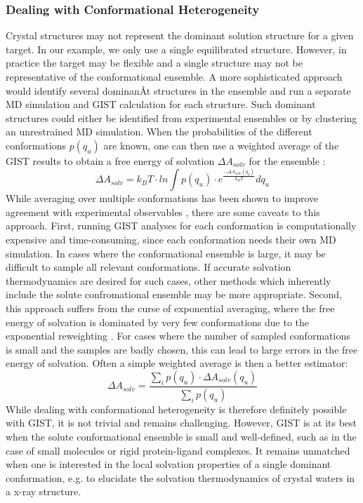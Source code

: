 \documentclass[9pt,tutorial]{livecoms}
\begin{document}
\subsubsection{Dealing with Conformational Heterogeneity}
Crystal structures may not represent the dominant solution structure for a given target.
In our example, we only use a single equilibrated structure.
However, in practice the target may be flexible and a single structure may not be representative of the conformational ensemble.
A more sophisticated approach would identify several dominanÅt structures in the ensemble and run a separate MD simulation and GIST calculation for each structure. 
Such dominant structures could either be identified from experimental ensembles or by clustering an unrestrained MD simulation. 
When the probabilities of the different conformations $p(q_u)$ are known, one can then use a weighted average of the GIST results to obtain a free energy of solvation $\Delta A_{solv}$ for the ensemble \cite{Waibl2021-gist-antibodies}:
\begin{equation}
	\Delta A_{solv} = k_BT \cdot ln \int p(q_u) \cdot e^{ \frac{-\Delta A_{solv}(q_u)}{k_BT}} dq_u
\end{equation}
While averaging over multiple conformations has been shown to improve agreement with experimental observables \cite{Kamenik2020-gist-macrocycles,Waibl2021-gist-antibodies}, there are some caveats to this approach. 
First, running GIST analyses for each conformation is computationally expensive and time-consuming, since each conformation needs their own MD simulation.
In cases where the conformational ensemble is large, it may be difficult to sample all relevant conformations. 
If accurate solvation thermodynamics are desired for such cases, other methods which inherently include the solute confromational ensemble may be more appropriate.
Second, this approach suffers from the curse of exponential averaging, where the free energy of solvation is dominated by very few conformations due to the exponential reweighting \cite{Ekberg2021-exponential}.
For cases where the number of sampled conformations is small and the samples are badly chosen, this can lead to large errors in the free energy of solvation.
Often a simple weighted average is then a better estimator:
\begin{equation}
	\Delta A_{solv} = \frac{\sum_i p(q_u) \cdot \Delta A_{solv}(q_u)}{\sum_i p(q_u)}
\end{equation}
While dealing with conformational heterogeneity is therefore definitely possible with GIST, it is not trivial and remains challenging.
However, GIST is at its best when the solute conformational ensemble is small and well-defined, such as in the case of small molecules or rigid protein-ligand complexes.
It remains unmatched when one is interested in the local solvation properties of a single dominant conformation, e.g. to elucidate the solvation thermodynamics of crystal waters in a x-ray structure.
\end{document}
